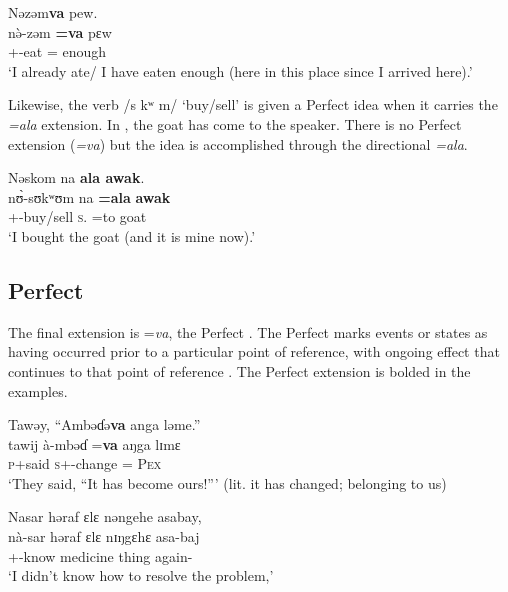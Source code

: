 \ea\label{ex:7:122}
Nəzəm\textbf{va} pew.\\
\gll  n\`ə-zəm  \textbf{=va} pɛw\\
      {\oneS}+{\PFV}-eat  ={\PRF}  enough\\
\glt  ‘I already ate/ I have eaten enough (here in this place since I arrived here).’\\
\z 

Likewise, the verb /s kʷ m/ ‘buy/sell’ is given a Perfect idea when it carries the \textit{=ala} extension. In , the goat has come to the speaker. There is no Perfect extension (\textit{=va})  but the idea is accomplished through the directional \textit{=ala}.

\ea\label{ex:7:123}
Nəskom  na  \textbf{ala  awak}.\\
\gll  n\`ʊ-sʊkʷʊm    na  \textbf{=ala}  \textbf{awak}\\
      {\oneS}+{\PFV}-buy/sell  \textsc{s}.{\DO}  =to  goat\\
\glt  ‘I bought the goat (and it is mine now).’\\
\z 
{}
\subsection{Perfect}\label{sec:7.5.3}
\hypertarget{RefHeading1212381525720847}{}
The final extension is =\textit{va}, the Perfect \citep{FriesenMamalis2008}. The Perfect marks events or states as having occurred prior to a particular point of reference, with ongoing effect that continues to that point of reference \citep{Comrie1976}. The Perfect extension is bolded in the examples. 

\ea\label{ex:7:124}
Tawəy, “Ambəɗə\textbf{va} anga  ləme.”\\
\gll  tawij     à-mbəɗ    =\textbf{va}  aŋga  lɪmɛ\\
      \textsc{p}+said    \textsc{s}+{\PFV}-change  ={\PRF}  {\POSS}  \textsc{Pex}\\
\glt  ‘They said, “It has become ours!”’ (lit. it has changed; belonging to us)\\
\z 

\ea\label{ex:7:125}
Nasar  həraf  ɛlɛ  nəngehe  asabay, \\
\gll  nà-sar      həraf  ɛlɛ nɪŋgɛhɛ asa-baj \\ 
      {\oneS}+{\PFV}-know  medicine  thing {\DEM} again-{\NEG} \\ 
\glt ‘I didn’t know how to resolve the problem,’ \\     
      
